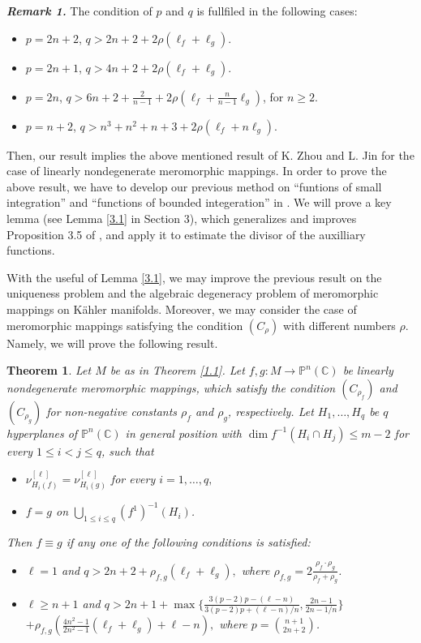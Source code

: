 \documentclass[12pt, a4paper, oneside]{amsart}
\newtheorem{theorem}[equation]{Theorem}
\newcommand{\C}{{\mathbb{C}}}
\renewcommand{\P}{{\mathbb{P}}}
\numberwithin{equation}{section}
\begin{document}
\noindent
\textbf{\textit{Remark 1.}} The condition of $p$ and $q$ is fullfiled in the following cases:
\begin{itemize}
\item[(1)] $p=2n+2$, $q> 2n+2+2\rho(\ell_f+\ell_g)$. 
\item[(2)] $p=2n+1$, $q> 4n+2+2\rho(\ell_f+\ell_g)$. 
\item[(3)] $p=2n$, $q>6n+2+\frac{2}{n-1}+2\rho\left(\ell_f+\frac{n}{n-1}\ell_g\right)$, for $n\ge 2$.
\item[(4)] $p=n+2$, $q>n^3+n^2+n+3+2\rho\left(\ell_f+n\ell_g\right)$. 
\end{itemize}
Then, our result implies the above mentioned result of K. Zhou and L. Jin for the case of linearly nondegenerate meromorphic mappings. In order to prove the above result, we have to develop our previous method on ``funtions of small integration'' and ``functions of bounded integeration'' in \cite{Q19,Q21}. We will prove a key lemma (see Lemma \ref{3.1} in Section 3), which generalizes and improves Proposition 3.5 of \cite{Q21}, and apply it to estimate the divisor of the auxilliary functions.  

With the useful of Lemma \ref{3.1}, we may improve the previous result on the uniqueness problem and the algebraic degeneracy problem of meromorphic mappings on K\"{a}hler manifolds. Moreover, we may consider the case of meromorphic mappings satisfying the condition $(C_\rho)$ with different numbers $\rho$.  Namely, we will prove the following result.

\begin{theorem}\label{1.2}
Let $M$ be as in Theorem \ref{1.1}. Let $f, g: M \rightarrow\P^n(\C)$ be linearly nondegenerate meromorphic mappings, which satisfy the condition $(C_{\rho_f})$ and $(C_{\rho_g})$ for non-negative constants $\rho_f$ and $\rho_g$, respectively. Let $H_1,\ldots,H_q$ be $q$ hyperplanes of $\P^n(\C)$ in general position with $\dim f^{-1}(H_i\cap H_j)\le m-2$ for every $1\le i<j\le q$, such that
\begin{itemize}
\item[(i)] $\nu^{[\ell]}_{H_i(f)}=\nu^{[\ell]}_{H_i(g)}$ for every $i=1,\ldots,q,$
\item[(ii)] $f=g$ on $\bigcup_{1\le i\le q}(f^1)^{-1}(H_i)$. 
\end{itemize}
Then $f\equiv g$ if any one of the following conditions is satisfied:
\begin{itemize}
\item[(a)] $\ell=1$ and $q>2n+2+\rho_{f,g}(\ell_f+\ell_g),$ where $\rho_{f,g}=2\frac{\rho_f\cdot\rho_g}{\rho_f+\rho_g}$.
\item[(b)] $\ell\ge n+1$ and $q>2n+1+\max\big\{\frac{3(p-2)p-(\ell-n)}{3(p-2)p+(\ell-n)/n},\frac{2n-1}{2n-1/n}\big\}$ $+\rho_{f,g}(\frac{4n^2-1}{2n^2-1}(\ell_f+\ell_g)+\ell-n),$ where $p=\binom{n+1}{2n+2}$. 
\end{itemize} 
\end{theorem}
\end{document}
